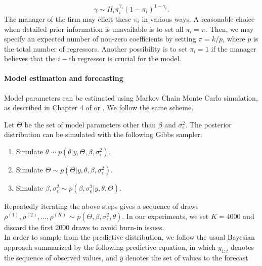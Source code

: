 $$
\gamma \sim \Pi_i \pi_i^{\gamma_i}(1-\pi_i)^{1-\gamma_i}.
$$
The manager of the firm may elicit these $\pi_i$ in various ways. A reasonable choice when detailed prior information is unavailable is to set all $\pi_i = \pi$. Then, we may specify an expected number of non-zero coefficients by setting $\pi = k/p$, where $p$ is the total number of regressors. Another possibility is to set $\pi_i = 1$ if the manager believes that the $i-$th regressor is crucial for the model. %

\paragraph{Model estimation and forecasting}\label{s:MCMC}

Model parameters can be estimated using Markov Chain Monte Carlo simulation, as described in Chapter 4 of \parencite{petris2009dynamic} or \parencite{scott2014predicting}. We follow the same scheme.

Let $\Theta$ be the set of model parameters other than $\beta$ and $\sigma^2_{\epsilon}$. The posterior distribution can be simulated with the following Gibbs sampler: %

\begin{enumerate}
\item Simulate $\theta \sim p(\theta | y, \Theta, \beta, \sigma^2_{\epsilon})$.
\item Simulate $\Theta \sim p(\Theta | y, \theta, \beta, \sigma^2_{\epsilon})$.
\item Simulate $\beta, \sigma^2_{\epsilon} \sim p(\beta, \sigma^2_{\epsilon} | y, \theta, \Theta)$.
\end{enumerate}
Repeatedly iterating the above steps gives a sequence of draws $\rho^{(1)}, \rho^{(2)}, \ldots, \rho^{(K)}$ $\sim$ $p(\Theta, \beta, \sigma^2_{\epsilon}, \theta)$. In our experiments, we set $K = 4000$ and discard the first 2000 draws to avoid burn-in issues. \\

In order to sample from the predictive distribution, we follow the usual Bayesian approach summarized by the following predictive equation, in which $y_{1:t}$ denotes the sequence of observed values, and $\bar{y}$ denotes the set of values to the forecast

